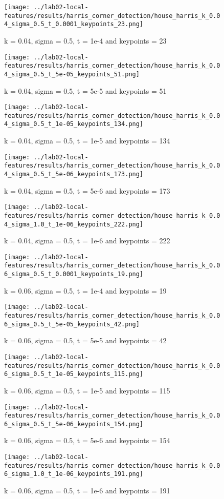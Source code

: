 \documentclass{ETHExercise}
\begin{document}
\begin{figure}
    \texttt{[image: ../lab02-local-features/results/harris\_corner\_detection/house\_harris\_k\_0.04\_sigma\_0.5\_t\_0.0001\_keypoints\_23.png]}
    \caption{k = 0.04, sigma = 0.5, t = 1e-4 and keypoints = 23}
  \endminipage\hfill
    \texttt{[image: ../lab02-local-features/results/harris\_corner\_detection/house\_harris\_k\_0.04\_sigma\_0.5\_t\_5e-05\_keypoints\_51.png]}
    \caption{k = 0.04, sigma = 0.5, t = 5e-5 and keypoints = 51}
  \endminipage\hfill
    \texttt{[image: ../lab02-local-features/results/harris\_corner\_detection/house\_harris\_k\_0.04\_sigma\_0.5\_t\_1e-05\_keypoints\_134.png]}
    \caption{k = 0.04, sigma = 0.5, t = 1e-5 and keypoints = 134}
  \endminipage\hfill
    \texttt{[image: ../lab02-local-features/results/harris\_corner\_detection/house\_harris\_k\_0.04\_sigma\_0.5\_t\_5e-06\_keypoints\_173.png]}
    \caption{k = 0.04, sigma = 0.5, t = 5e-6 and keypoints = 173}
  \endminipage\space\space\space 
    \texttt{[image: ../lab02-local-features/results/harris\_corner\_detection/house\_harris\_k\_0.04\_sigma\_1.0\_t\_1e-06\_keypoints\_222.png]}
    \caption{k = 0.04, sigma = 0.5, t = 1e-6 and keypoints = 222}
  \endminipage
\end{figure}
 

  \begin{figure}
      \texttt{[image: ../lab02-local-features/results/harris\_corner\_detection/house\_harris\_k\_0.06\_sigma\_0.5\_t\_0.0001\_keypoints\_19.png]}
      \caption{k = 0.06, sigma = 0.5, t = 1e-4 and keypoints = 19}
    \endminipage\hfill
      \texttt{[image: ../lab02-local-features/results/harris\_corner\_detection/house\_harris\_k\_0.06\_sigma\_0.5\_t\_5e-05\_keypoints\_42.png]}
      \caption{k = 0.06, sigma = 0.5, t = 5e-5 and keypoints = 42}
    \endminipage\hfill
      \texttt{[image: ../lab02-local-features/results/harris\_corner\_detection/house\_harris\_k\_0.06\_sigma\_0.5\_t\_1e-05\_keypoints\_115.png]}
      \caption{k = 0.06, sigma = 0.5, t = 1e-5 and keypoints = 115}
    \endminipage\hfill
      \texttt{[image: ../lab02-local-features/results/harris\_corner\_detection/house\_harris\_k\_0.06\_sigma\_0.5\_t\_5e-06\_keypoints\_154.png]}
      \caption{k = 0.06, sigma = 0.5, t = 5e-6 and keypoints = 154}
    \endminipage\space\space\space 
      \texttt{[image: ../lab02-local-features/results/harris\_corner\_detection/house\_harris\_k\_0.06\_sigma\_1.0\_t\_1e-06\_keypoints\_191.png]}
      \caption{k = 0.06, sigma = 0.5, t = 1e-6 and keypoints = 191}
    \endminipage
\end{figure}
\end{document}
